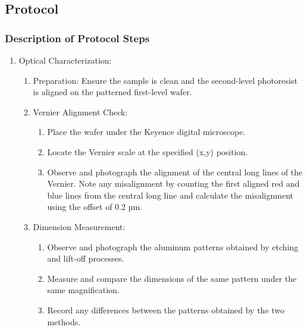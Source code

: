 \pagebreak
\subsection{Protocol}
\subsubsection{Description of Protocol Steps}
\begin{enumerate}
    \item Optical Characterization:
    \begin{enumerate}
        \item Preparation: Ensure the sample is clean and the second-level photoresist is aligned on the patterned first-level wafer.
        \item Vernier Alignment Check:
        \begin{enumerate}
            \item Place the wafer under the Keyence digital microscope.
            \item Locate the Vernier scale at the specified (x,y) position.
            \item Observe and photograph the alignment of the central long lines of the Vernier. Note any misalignment by counting the first aligned red and blue lines from the central long line and calculate the misalignment using the offset of 0.2 µm.
        \end{enumerate}
        \item Dimension Measurement:
        \begin{enumerate}
            \item Observe and photograph the aluminum patterns obtained by etching and lift-off processes.
            \item Measure and compare the dimensions of the same pattern under the same magnification.
            \item Record any differences between the patterns obtained by the two methods.
        \end{enumerate}
    \end{enumerate}
    

\end{enumerate}
